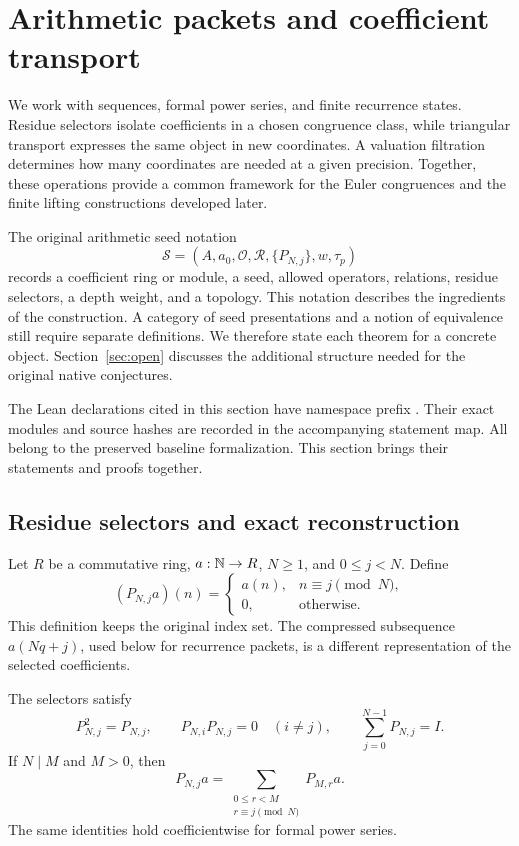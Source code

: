 \section{Arithmetic packets and coefficient transport}
\label{sec:foundations}

We work with sequences, formal power series, and finite recurrence states.
Residue selectors isolate coefficients in a chosen congruence class, while
triangular transport expresses the same object in new coordinates. A valuation
filtration determines how many coordinates are needed at a given precision.
Together, these operations provide a common framework for the Euler
congruences and the finite lifting constructions developed later.

The original arithmetic seed notation
\[
\mathcal S=(A,a_0,\mathcal O,\mathcal R,\{P_{N,j}\},w,\tau_p)
\]
records a coefficient ring or module, a seed, allowed operators, relations,
residue selectors, a depth weight, and a topology. This notation describes the
ingredients of the construction. A category of seed presentations and a
notion of equivalence still require separate definitions. We therefore state
each theorem for a concrete object. Section~\ref{sec:open} discusses the
additional structure needed for the original native conjectures.

The Lean declarations cited in this section have namespace prefix
. Their exact modules and source hashes are recorded in
the accompanying statement map. All belong to the preserved baseline
formalization. This section brings their statements and proofs together.

\subsection{Residue selectors and exact reconstruction}

Let $R$ be a commutative ring, $a:\mathbb N\to R$, $N\geq1$, and $0\leq j<N$.
Define
\[
(P_{N,j}a)(n)=
\begin{cases}
a(n),&n\equiv j\pmod N,\\
0,&\text{otherwise}.
\end{cases}
\]
This definition keeps the original index set. The compressed subsequence
$a(Nq+j)$, used below for recurrence packets, is a different representation of
the selected coefficients.

\begin{theorem}
\label{thm:residue-reconstruction}
The selectors satisfy
\[
P_{N,j}^2=P_{N,j},\qquad P_{N,i}P_{N,j}=0\quad(i\ne j),
\qquad \sum_{j=0}^{N-1}P_{N,j}=I.
\]
If $N\mid M$ and $M>0$, then
\[
P_{N,j}a=\sum_{\substack{0\leq r<M\\r\equiv j\pmod N}}P_{M,r}a.
\]
The same identities hold coefficientwise for formal power series.
\end{theorem}

